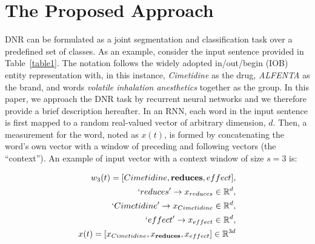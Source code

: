 \documentclass[11pt,letterpaper]{article}
\begin{document}
\begin{table*}[ht]	
	\centering
	\caption{Statistics of training and test datasets used for SemEval-2013 Task 9.1.}
	\label{table2} 
\end{table*}
	
\section{The Proposed Approach}
DNR can be formulated as a joint segmentation and classification task over a predefined set of classes. As an example, consider the input sentence provided in Table~\ref{table1}. The notation follows the widely adopted in/out/begin (IOB) entity representation with, in this instance, \textit{Cimetidine} as the drug, \textit{ALFENTA} as the brand, and words \textit{volatile inhalation anesthetics} together as the group. In this paper, we approach the DNR task by recurrent neural networks and we therefore provide a brief description hereafter. In an RNN, each word in the input sentence is first mapped to a random real-valued  vector of arbitrary dimension, $d$. Then, a measurement for the word, noted as $x(t)$, is formed by concatenating the word's own vector with a window of preceding and following vectors (the ``context''). An example of input vector with a context window of size $s = 3$ is:

\begin{equation}
\begin{split}
w_{3}(t) = [Cimetidine, \textbf{reduces}, effect], \\
`reduces' \rightarrow x_{reduces} \in \mathbb{R}^{d}, \\
`Cimetidine' \rightarrow x_{Cimetidine} \in \mathbb{R}^{d}, \\
`effect' \rightarrow x_{effect} \in \mathbb{R}^{d}, \\
x(t) = [x_{Cimetidine}, x_{\textbf{reduces}}, x_{effect}] \in \mathbb{R}^{3d}
\end{split}
\end{equation}
\end{document}

